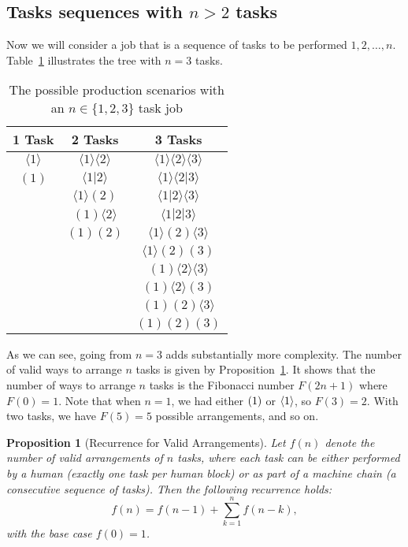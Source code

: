 \documentclass{article}
\theoremstyle{plain}
\theoremstyle{plain}
\newtheorem{proposition}[theorem]{Proposition}
\begin{document}
\subsection{Tasks sequences with \(n > 2\) tasks}
Now we will consider a job that is a sequence of tasks to be performed \(1, 2, \ldots, n\).
Table~\ref{tab:tree} illustrates the tree with \(n=3\) tasks.

\begin{table}
  \centering
  \caption{The possible production scenarios with an \(n \in \{1,2,3\}\) task job}
  \label{tab:tree}
  \begin{tabular}{ccc}
  \hline
  1 Task & 2 Tasks & 3 Tasks \\
  \hline
  $\langle 1 \rangle$ & $\langle 1 \rangle \langle 2 \rangle$ & $\langle 1 \rangle \langle 2 \rangle \langle 3 \rangle$ \\
  $(1)$ & $\langle 1|2 \rangle$ & $\langle 1 \rangle \langle 2|3 \rangle$ \\
  & $\langle 1 \rangle (2)$ & $\langle 1|2 \rangle \langle 3 \rangle$ \\
  & $(1) \langle 2 \rangle$ & $\langle 1|2|3 \rangle$ \\
  & $(1) (2)$ & $\langle 1 \rangle (2) \langle 3 \rangle$ \\
  & & $\langle 1 \rangle (2) (3)$ \\
  & & $(1) \langle 2 \rangle \langle 3 \rangle$ \\
  & & $(1) \langle 2 \rangle (3)$ \\
  & & $(1) (2) \langle 3 \rangle$ \\
  & & $(1) (2) (3)$ \\
  \hline
  \end{tabular}
\end{table}

As we can see, going from \(n=3\) adds substantially more complexity.
The number of valid ways to arrange \(n\) tasks is given by Proposition~\ref{proposition:num_arrangements}.
It shows that the number of ways to arrange \(n\) tasks is the Fibonacci number \(F(2n+1)\) where \(F(0) = 1\).
Note that when \(n=1\), we had either \(( 1 )\) or \(\langle 1 \rangle\), so \(F(3) = 2\).
With two tasks, we have \(F(5) = 5\) possible arrangements, and so on. 

\begin{proposition}[Recurrence for Valid Arrangements] \label{proposition:num_arrangements}
  Let \(f(n)\) denote the number of valid arrangements of \(n\) tasks, where each task can be either performed by a human (exactly one task per human block) or as part of a machine chain (a consecutive sequence of tasks). Then the following recurrence holds:
  \[
  f(n) = f(n-1) + \sum_{k=1}^{n} f(n-k),
  \]
  with the base case \(f(0) = 1\).
\end{proposition}
\end{document}
